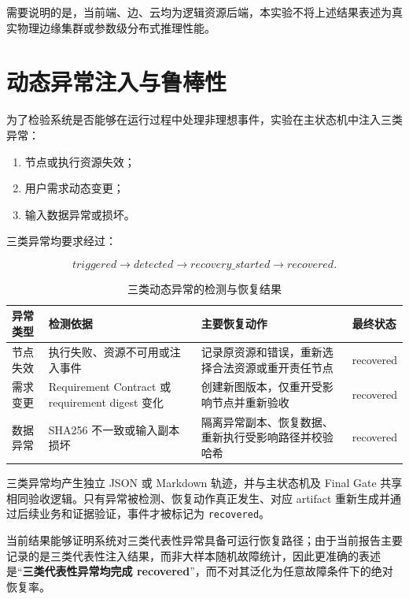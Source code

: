 \documentclass[UTF8,a4paper,12pt,oneside]{ctexbook}
\begin{document}
需要说明的是，当前端、边、云均为逻辑资源后端，本实验不将上述结果表述为真实物理边缘集群或参数级分布式推理性能。


\section{动态异常注入与鲁棒性}

为了检验系统是否能够在运行过程中处理非理想事件，实验在主状态机中注入三类异常：

\begin{enumerate}
    \item 节点或执行资源失效；
    \item 用户需求动态变更；
    \item 输入数据异常或损坏。
\end{enumerate}

三类异常均要求经过：

\[
triggered
\rightarrow
detected
\rightarrow
recovery\_started
\rightarrow
recovered.
\]

\begin{table}[htbp]
\centering
\caption{三类动态异常的检测与恢复结果}
\label{tab:dynamic-injection-results}
\begin{tabularx}{0.97\textwidth}{p{}X X p{}}
\toprule
异常类型 & 检测依据 & 主要恢复动作 & 最终状态\\
\midrule

节点失效
&
执行失败、资源不可用或注入事件
&
记录原资源和错误，重新选择合法资源或重开责任节点
&
recovered\\

需求变更
&
Requirement Contract 或 requirement digest 变化
&
创建新图版本，仅重开受影响节点并重新验收
&
recovered\\

数据异常
&
SHA256 不一致或输入副本损坏
&
隔离异常副本、恢复数据、重新执行受影响路径并校验哈希
&
recovered\\

\bottomrule
\end{tabularx}
\end{table}

三类异常均产生独立 JSON 或 Markdown 轨迹，并与主状态机及 Final Gate 共享相同验收逻辑。只有异常被检测、恢复动作真正发生、对应 artifact 重新生成并通过后续业务和证据验证，事件才被标记为 \texttt{recovered}。

当前结果能够证明系统对三类代表性异常具备可运行恢复路径；由于当前报告主要记录的是三类代表性注入结果，而非大样本随机故障统计，因此更准确的表述是“\textbf{三类代表性异常均完成 recovered}”，而不对其泛化为任意故障条件下的绝对恢复率。
\end{document}
